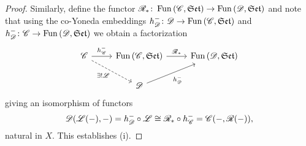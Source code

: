 \documentclass[10pt]{amsart}
\begin{document}
\begin{prop}
\begin{proof}
    Similarly, define the functor $\mathscr{R}_\ast \colon \operatorname{Fun}\left(\mathscr{C}, \mathfrak{Set}\right) \to \operatorname{Fun}\left(\mathscr{D}, \mathfrak{Set}\right)$ and note that using the co-Yoneda embeddings $h^-_{\mathscr{D}} \colon \mathscr{D} \to \operatorname{Fun}\left(\mathscr{C}, \mathfrak{Set}\right)$ and $h^-_{\mathscr{D}} \colon \mathscr{C} \to \operatorname{Fun}\left(\mathscr{D}, \mathfrak{Set}\right)$ we obtain a factorization 
    $$\begin{tikzcd}
      \C \arrow{r}{h^-_\C}\arrow[dashed,swap]{rd}{\exists ! \LA} & \Fun{\C}{\Sets} \arrow{r}{\RA_\ast} & \Fun{\D}{\Sets}\\
      & \D \arrow[swap]{ur}{h^-_{\D}}
    \end{tikzcd}$$
    giving an isomorphism of functors
    $$\mathscr{D}(\mathscr{L}(-), -) = h_{\mathscr{D}}^- \circ \mathscr{L} \cong \mathscr{R}_\ast \circ h_{\mathscr{C}}^- = \mathscr{C}(-, \mathscr{R}( - )),$$
    natural in $X$.
    This establishes (i).
  \end{proof}
\end{prop}
\end{document}
